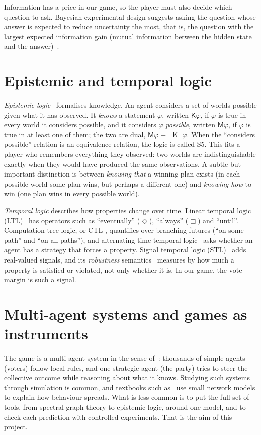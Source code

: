 \documentclass[11pt,a4paper,oneside]{report}
\newcommand{\Kop}{\mathsf{K}}
\newcommand{\Mop}{\mathsf{M}}
\begin{document}
Information has a price in our game, so the player must also decide which question to ask. Bayesian
experimental design suggests asking the question whose answer is expected to reduce uncertainty the most,
that is, the question with the largest expected information gain (mutual information between the hidden
state and the answer)~\cite{lindley1956,chaloner1995}.

\section{Epistemic and temporal logic}

\emph{Epistemic logic}~\cite{fagin1995} formalises knowledge. An agent considers a set of worlds possible
given what it has observed. It \emph{knows} a statement $\varphi$, written $\Kop\varphi$, if $\varphi$ is
true in every world it considers possible, and it considers $\varphi$ \emph{possible}, written
$\Mop\varphi$, if $\varphi$ is true in at least one of them; the two are dual, $\Mop\varphi \equiv
\lnot\Kop\lnot\varphi$. When the ``considers possible'' relation is an equivalence relation, the logic is
called S5. This fits a player who remembers everything they observed: two worlds are indistinguishable
exactly when they would have produced the same observations. A subtle but important distinction is between
\emph{knowing that} a winning plan exists (in each possible world some plan wins, but perhaps a different
one) and \emph{knowing how} to win (one plan wins in every possible world).

\emph{Temporal logic} describes how properties change over time. Linear temporal logic (LTL)~\cite{pnueli1977}
has operators such as ``eventually'' ($\Diamond$), ``always'' ($\Box$) and ``until''. Computation tree
logic, or CTL \cite{clarke1986}, quantifies over branching futures (``on some path'' and ``on all paths''),
and alternating-time temporal logic~\cite{alur2002} asks whether an agent has a strategy that forces a
property. Signal temporal logic (STL)~\cite{maler2004} adds real-valued signals, and its \emph{robustness}
semantics~\cite{donze2010} measures by how much a property is satisfied or violated, not only whether it
is. In our game, the vote margin is such a signal.

\section{Multi-agent systems and games as instruments}

The game is a multi-agent system in the sense of~\cite{wooldridge2009,shoham2009}: thousands of simple
agents (voters) follow local rules, and one strategic agent (the party) tries to steer the collective
outcome while reasoning about what it knows. Studying such systems through simulation is common, and
textbooks such as~\cite{easley2010} use small network models to explain how behaviour spreads. What is
less common is to put the full set of tools, from spectral graph theory to epistemic logic, around one
model, and to check each prediction with controlled experiments. That is the aim of this project.
\end{document}
